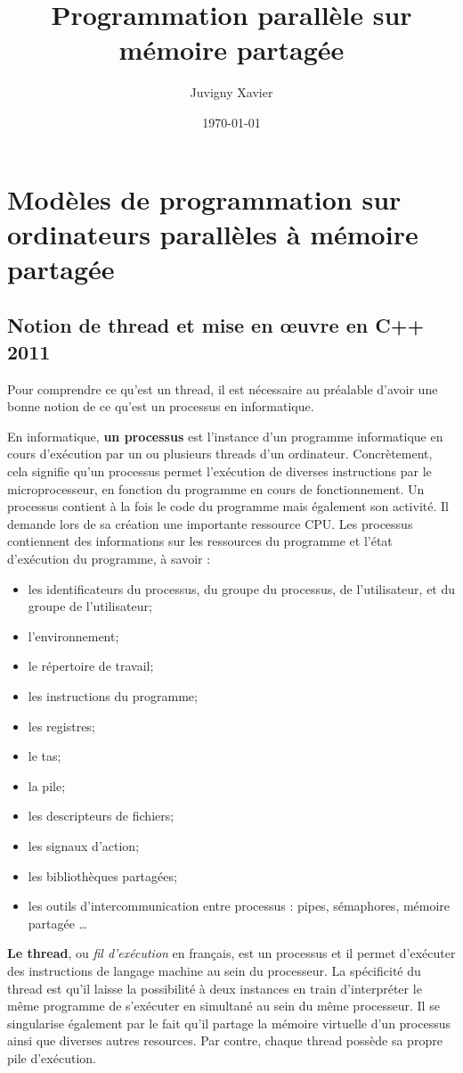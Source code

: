 \documentclass[fleqn,11pt]{article}
\title{Programmation parallèle sur mémoire partagée}
\author{Juvigny Xavier}
\date{\today}
\begin{document}
\maketitle
\tableofcontents

\section{Modèles de programmation sur ordinateurs parallèles à mémoire partagée}

\subsection{Notion de thread et mise en {\oe}uvre en C++ 2011}

Pour comprendre ce qu'est un thread, il est nécessaire au préalable d'avoir une bonne notion de ce
qu'est un processus en informatique.

En informatique, \textbf{un processus} est l’instance d’un programme informatique en cours d’exécution par un ou plusieurs threads d’un ordinateur. Concrètement, cela signifie qu’un processus permet l’exécution de diverses instructions par le microprocesseur, en fonction du programme en cours de fonctionnement. Un processus contient à la fois le code du programme mais également son activité. Il demande lors de sa création une
importante ressource CPU. Les processus contiennent des informations sur les ressources
du programme et l'état d'exécution du programme, à savoir :
\begin{itemize}
 \item les identificateurs du processus, du groupe du processus, de l'utilisateur, et du groupe de l'utilisateur;
 \item l'environnement;
 \item le répertoire de travail;
 \item les instructions du programme;
 \item les registres;
 \item le tas;
 \item la pile;
 \item les descripteurs de fichiers;
 \item les signaux d'action;
 \item les bibliothèques partagées;
 \item les outils d'intercommunication entre processus : pipes, sémaphores, mémoire partagée \ldots
\end{itemize}

\textbf{Le thread}, ou \textsl{fil d’exécution} en français, est un  processus et il permet d’exécuter des instructions de langage machine au sein du processeur. La spécificité du thread est qu’il laisse la possibilité à deux instances en train d’interpréter le même programme de s’exécuter en simultané au sein du même processeur. Il se singularise également par le fait qu'il partage la mémoire virtuelle d'un processus ainsi que diverses autres resources. Par contre, chaque thread possède sa propre pile d'exécution.
\end{document}
